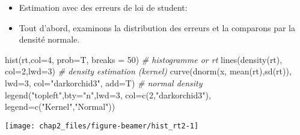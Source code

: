 \documentclass[
  ignorenonframetext,
]{beamer}
\newenvironment{Shaded}{\begin{snugshade}}{\end{snugshade}}
\newcommand{\AttributeTok}[1]{\textcolor[rgb]{0.77,0.63,0.00}{#1}}
\newcommand{\CommentTok}[1]{\textcolor[rgb]{0.56,0.35,0.01}{\textit{#1}}}
\newcommand{\DecValTok}[1]{\textcolor[rgb]{0.00,0.00,0.81}{#1}}
\newcommand{\FunctionTok}[1]{\textcolor[rgb]{0.00,0.00,0.00}{#1}}
\newcommand{\NormalTok}[1]{#1}
\newcommand{\StringTok}[1]{\textcolor[rgb]{0.31,0.60,0.02}{#1}}
\newenvironment{Shaded}{\begin{snugshade}}{\end{snugshade}}
\newcommand{\AttributeTok}[1]{\textcolor[rgb]{0.77,0.63,0.00}{#1}}
\newcommand{\CommentTok}[1]{\textcolor[rgb]{0.56,0.35,0.01}{\textit{#1}}}
\newcommand{\DecValTok}[1]{\textcolor[rgb]{0.00,0.00,0.81}{#1}}
\newcommand{\FunctionTok}[1]{\textcolor[rgb]{0.00,0.00,0.00}{#1}}
\newcommand{\NormalTok}[1]{#1}
\newcommand{\StringTok}[1]{\textcolor[rgb]{0.31,0.60,0.02}{#1}}
\begin{document}
\begin{frame}[fragile]
\begin{itemize}[<+->]
\item
  Estimation avec des erreurs de loi de student:
\item
  Tout d'abord, examinons la distribution des erreurs et la comparons
  par la densité normale.
\end{itemize}
\begin{Shaded}
\begin{Highlighting}[]
\FunctionTok{hist}\NormalTok{(rt,}\AttributeTok{col=}\DecValTok{4}\NormalTok{, }\AttributeTok{prob=}\NormalTok{T, }\AttributeTok{breaks =} \DecValTok{50}\NormalTok{) }\CommentTok{\# histogramme or rt}
\FunctionTok{lines}\NormalTok{(}\FunctionTok{density}\NormalTok{(rt), }\AttributeTok{col=}\DecValTok{2}\NormalTok{,}\AttributeTok{lwd=}\DecValTok{3}\NormalTok{) }\CommentTok{\# density estimation (kernel)}
\FunctionTok{curve}\NormalTok{(}\FunctionTok{dnorm}\NormalTok{(x, }\FunctionTok{mean}\NormalTok{(rt),}\FunctionTok{sd}\NormalTok{(rt)), }\AttributeTok{lwd=}\DecValTok{3}\NormalTok{, }\AttributeTok{col=}\StringTok{"darkorchid3"}\NormalTok{, }\AttributeTok{add=}\NormalTok{T) }\CommentTok{\# normal density}
\FunctionTok{legend}\NormalTok{(}\StringTok{"topleft"}\NormalTok{,}\AttributeTok{bty=}\StringTok{"n"}\NormalTok{,}\AttributeTok{lwd=}\DecValTok{3}\NormalTok{, }\AttributeTok{col=}\FunctionTok{c}\NormalTok{(}\DecValTok{2}\NormalTok{,}\StringTok{"darkorchid3"}\NormalTok{),}
       \AttributeTok{legend=}\FunctionTok{c}\NormalTok{(}\StringTok{"Kernel"}\NormalTok{,}\StringTok{"Normal"}\NormalTok{))}
\end{Highlighting}
\end{Shaded}
\end{frame}
\begin{frame}
\begin{center}\texttt{[image: chap2\_files/figure-beamer/hist\_rt2-1]} \end{center}
\end{frame}
\end{document}
